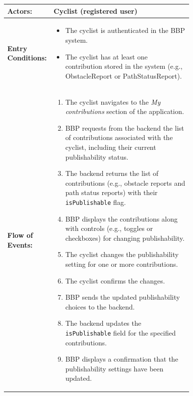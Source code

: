 \begin{center}
\begin{longtable}{|l|p{0.75\linewidth}|}
    \hline
    \textbf{Actors:}           
    & Cyclist (registered user)                                                                      \\
    \hline

    \textbf{Entry Conditions:} 
    & \begin{itemize}
          \item The cyclist is authenticated in the BBP system.
          \item The cyclist has at least one contribution stored in the system (e.g., ObstacleReport or PathStatusReport).
       \end{itemize}                                                                                 \\
    \hline

    \textbf{Flow of Events:}   
    & \begin{enumerate}
          \item The cyclist navigates to the \emph{My contributions} section of the application.
          \item BBP requests from the backend the list of contributions associated with the cyclist, including their current publishability status.
          \item The backend returns the list of contributions (e.g., obstacle reports and path status reports) with their \texttt{isPublishable} flag.
          \item BBP displays the contributions along with controls (e.g., toggles or checkboxes) for changing publishability.
          \item The cyclist changes the publishability setting for one or more contributions.
          \item The cyclist confirms the changes.
          \item BBP sends the updated publishability choices to the backend.
          \item The backend updates the \texttt{isPublishable} field for the specified contributions.
          \item BBP displays a confirmation that the publishability settings have been updated.
       \end{enumerate}                                                                                \\
    \hline


\end{longtable}
\end{center}
